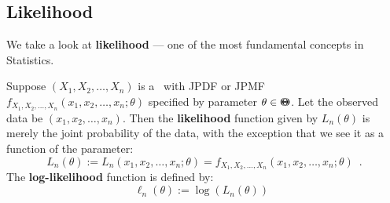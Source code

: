 \subsection{Likelihood}\label{S:Likelihood}
We take a look at {\bf likelihood} --- one of the most fundamental concepts in Statistics.  

\begin{definition}\label{D:LklFn}
{\rm
Suppose $(X_1,X_2,\ldots,X_n)$ is a \rv~with JPDF or JPMF $f_{X_1,X_2,\ldots,X_n}(x_1,x_2,\ldots,x_n; \theta)$ specified by parameter $\theta \in {\Theta}\mspace{-11 mu}{\Theta}$.  
Let the observed data be $(x_1,x_2,\ldots,x_n)$.  
Then the {\bf likelihood} function given by $L_n(\theta)$ is merely the joint probability of the data, with the exception that we see it as a function of the parameter:
\begin{equation}
\boxed{
L_n(\theta) := L_n(x_1,x_2,\ldots,x_n; \theta) = f_{X_1,X_2,\ldots,X_n}(x_1,x_2,\ldots,x_n; \theta) \enspace .
}
\end{equation}
The {\bf log-likelihood} function is defined by:
\begin{equation}
\boxed{
\ell_n(\theta) := \log(L_n(\theta))
} \enspace
\end{equation}
}
\end{definition}

